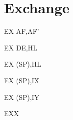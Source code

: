 \section{Exchange}

\begin{minipage}{\textwidth}
	
\begin{instrtable}	

	\begin{instruction}{EX AF,AF'} 
			\FlagsEXaf
	\end{instruction}

	\begin{instruction}{EX DE,HL} 
			\FlagsEXrr
	\end{instruction}

	\begin{instruction}{EX (SP),HL} 
			\FlagsEXrr
		\SkipToSymbol 
	\end{instruction}

	\begin{instruction}{EX (SP),IX} 
			\FlagsEXrr
		\SkipToSymbol
			\FromSymbolToOpCode
	\end{instruction}

	\begin{instruction}{EX (SP),IY} 
			\FlagsEXrr
		\SkipToSymbol
			\FromSymbolToOpCode
	\end{instruction}

	\begin{lastinstruction}{EXX} 
		\Symbol{\SymEXX[0]}
			\FlagsEXX
		\SkipToSymbol
			\Symbol{\SymEXX[1]}
		\SkipToSymbol
			\Symbol{\SymEXX[2]}
	\end{lastinstruction}
	
\end{instrtable}

\NoteTableSingleItemSpaceCorrection

\begin{notestable}
\end{notestable}

\end{minipage}
